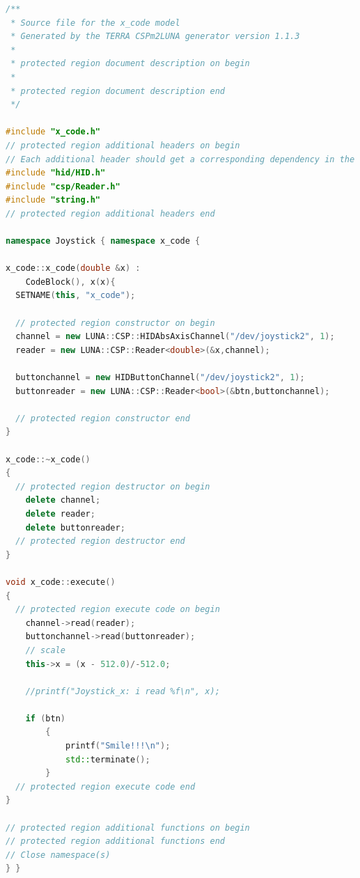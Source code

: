 \documentclass[a4paper,twoside,11pt]{article}
\begin{document}
\begin{lstlisting}[caption=x\_code Joystick C++ code block, label=code:x_code, language=C++]
/**
 * Source file for the x_code model
 * Generated by the TERRA CSPm2LUNA generator version 1.1.3
 *
 * protected region document description on begin
 *
 * protected region document description end
 */

#include "x_code.h"
// protected region additional headers on begin
// Each additional header should get a corresponding dependency in the Makefile
#include "hid/HID.h"
#include "csp/Reader.h"
#include "string.h"
// protected region additional headers end

namespace Joystick { namespace x_code { 

x_code::x_code(double &x) :
    CodeBlock(), x(x){
  SETNAME(this, "x_code");

  // protected region constructor on begin
  channel = new LUNA::CSP::HIDAbsAxisChannel("/dev/joystick2", 1);
  reader = new LUNA::CSP::Reader<double>(&x,channel);

  buttonchannel = new HIDButtonChannel("/dev/joystick2", 1);
  buttonreader = new LUNA::CSP::Reader<bool>(&btn,buttonchannel);

  // protected region constructor end
}

x_code::~x_code()
{
  // protected region destructor on begin
	delete channel;
	delete reader;
	delete buttonreader;
  // protected region destructor end
}

void x_code::execute()
{
  // protected region execute code on begin
	channel->read(reader);
	buttonchannel->read(buttonreader);
	// scale
	this->x = (x - 512.0)/-512.0;

	//printf("Joystick_x: i read %f\n", x);

	if (btn)
		{
			printf("Smile!!!\n");
			std::terminate();
		}
  // protected region execute code end
}

// protected region additional functions on begin
// protected region additional functions end
// Close namespace(s)
} } 
\end{lstlisting}
\end{document}
